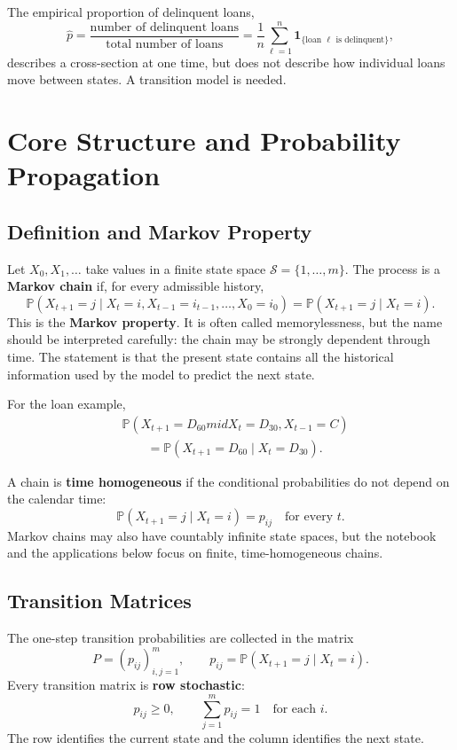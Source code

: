 \documentclass[12pt,openany]{book}
\theoremstyle{definition}
\theoremstyle{remark}
\begin{document}
The empirical proportion of delinquent loans,
\[
\widehat p
=\frac{\text{number of delinquent loans}}
       {\text{total number of loans}}
=\frac{1}{n}\sum_{\ell=1}^{n}
\mathbf{1}_{\{\text{loan }\ell\text{ is delinquent}\}},
\]
describes a cross-section at one time, but does not describe how individual
loans move between states. A transition model is needed.

\section{Core Structure and Probability Propagation}

\subsection{Definition and Markov Property}

Let \(X_0,X_1,\ldots\) take values in a finite state space
\(\mathcal{S}=\{1,\ldots,m\}\). The process is a \textbf{Markov chain} if,
for every admissible history,
\[
\boxed{
\mathbb{P}(X_{t+1}=j\mid X_t=i,X_{t-1}=i_{t-1},\ldots,X_0=i_0)
=\mathbb{P}(X_{t+1}=j\mid X_t=i)
}.
\]
This is the \textbf{Markov property}. It is often called memorylessness, but
the name should be interpreted carefully: the chain may be strongly
dependent through time. The statement is that the present state contains all
the historical information used by the model to predict the next state.

For the loan example,
\[
\begin{aligned}
&\mathbb{P}(X_{t+1}=D_{60}mid X_t=D_{30},X_{t-1}=C)\\
&\qquad=
\mathbb{P}(X_{t+1}=D_{60}\mid X_t=D_{30}).
\end{aligned}
\]

A chain is \textbf{time homogeneous} if the conditional probabilities do not
depend on the calendar time:
\[
\mathbb{P}(X_{t+1}=j\mid X_t=i)=p_{ij}
\quad\text{for every }t.
\]
Markov chains may also have countably infinite state spaces, but the notebook
and the applications below focus on finite, time-homogeneous chains.

\subsection{Transition Matrices}

The one-step transition probabilities are collected in the matrix
\[
P=(p_{ij})_{i,j=1}^{m},
\qquad
p_{ij}=\mathbb{P}(X_{t+1}=j\mid X_t=i).
\]
Every transition matrix is \textbf{row stochastic}:
\[
p_{ij}\geq0,
\qquad
\sum_{j=1}^{m}p_{ij}=1
\quad\text{for each }i.
\]
The row identifies the current state and the column identifies the next
state.
\end{document}
